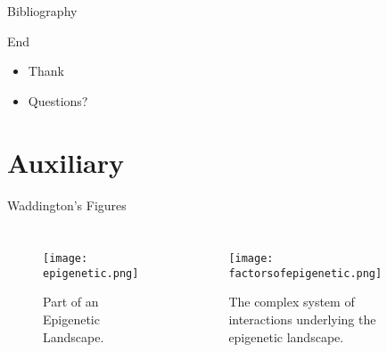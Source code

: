\documentclass[aspectratio=169, onlytextwidth,  notheorems, sOuRcEs, fleqn, leqno, ]{RUCPresentation}
\begin{document}
\begin{frame}[t, allowdisplaybreaks=4]{Bibliography}


    \printbibliography


\end{frame}

\begin{frame}[t]{End}

    \begin{itemize}
        \item Thank
        \item Questions?
    \end{itemize}

\end{frame}





\appendix
\section{Auxiliary}

\frame[noframenumbering]{\sectionpage}

\begin{frame}{Waddington's Figures}

    \begin{columns}%

        \column{0.5\framewidth}
    \begin{figure}[htbp]
    \centering
    \texttt{[image: epigenetic.png]}
    \caption{
        Part of an Epigenetic Landscape.
    }
    \end{figure}

        \column{0.5\framewidth}
    \begin{figure}[htbp]
    \centering
    \texttt{[image: factorsofepigenetic.png]}
    \caption{
        The complex system of interactions underlying the epigenetic landscape.
    }
    \end{figure}

    \end{columns}

\end{frame}
\end{document}
